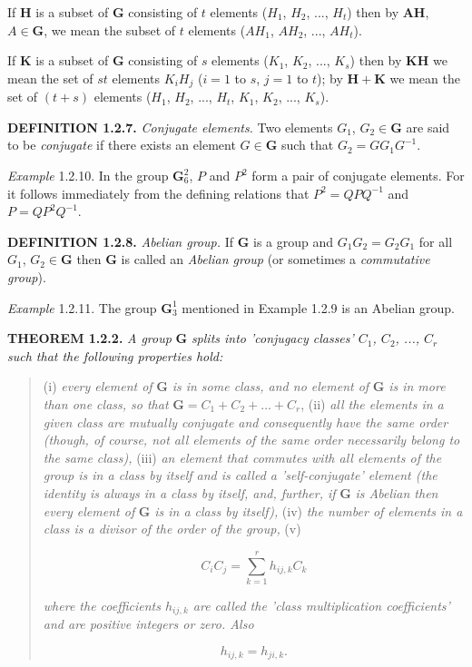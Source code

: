 \documentclass[11pt,a4paper,twoside,openright]{book}
\begin{document}
If $\mathbf{H}$ is a subset of $\mathbf{G}$ consisting of $t$ elements ($H_{1}$, $H_{2}$, ..., $H_{t}$) then by $\mathbf{AH}$, $A \in \mathbf{G}$, we mean the subset of $t$ elements ($AH_{1}$, $AH_{2}$, ..., $AH_{t}$).

If $\mathbf{K}$ is a subset of $\mathbf{G}$ consisting of $s$ elements ($K_{1}$, $K_{2}$, ..., $K_{s}$) then by $\mathbf{KH}$ we mean the set of $st$ elements $K_{i}H_{j}$ ($i = 1$ to $s$, $j = 1$ to $t$); by $\mathbf{H} + \mathbf{K}$ we mean the set of $(t+s)$ elements ($H_{1}$, $H_{2}$, ..., $H_{t}$, $K_{1}$, $K_{2}$, ..., $K_{s}$).

\textbf{DEFINITION 1.2.7.} \textit{Conjugate elements.} Two elements $G_{1}$, $G_{2} \in \mathbf{G}$ are said to be \textit{conjugate} if there exists an element $G \in \mathbf{G}$ such that $G_{2} = GG_{1}G^{-1}$.

\textit{Example} 1.2.10. In the group $\mathbf{G}_6^2$, $P$ and $P^{2}$ form a pair of conjugate elements. For it follows immediately from the defining relations that $P^{2} = QPQ^{-1}$ and $P = QP^{2}Q^{-1}$.

\textbf{DEFINITION 1.2.8.} \textit{Abelian group.} If $\mathbf{G}$ is a group and $G_{1}G_{2} = G_{2}G_{1}$ for all $G_{1}$, $G_{2} \in \mathbf{G}$ then $\mathbf{G}$ is called an \textit{Abelian group} (or sometimes a \textit{commutative group}).

\textit{Example} 1.2.11. The group $\mathbf{G}_3^1$ mentioned in Example 1.2.9 is an Abelian group.

\textbf{THEOREM 1.2.2.} \textit{A group} $\mathbf{G}$ \textit{splits into 'conjugacy classes' $C_{1}$, $C_{2}$, ..., $C_{r}$ such that the following properties hold:}

\begin{quote}(i) \textit{every element of} $\mathbf{G}$ \textit{is in some class, and no element of} $\mathbf{G}$ \textit{is in more than one class, so that} $\mathbf{G} = C_{1} + C_{2} + \ldots + C_{r}$, (ii) \textit{all the elements in a given class are mutually conjugate and consequently have the same order (though, of course, not all elements of the same order necessarily belong to the same class),} (iii) \textit{an element that commutes with all elements of the group is in a class by itself and is called a 'self-conjugate' element (the identity is always in a class by itself, and, further, if} $\mathbf{G}$ \textit{is Abelian then every element of} $\mathbf{G}$ \textit{is in a class by itself),} (iv) \textit{the number of elements in a class is a divisor of the order of the group,} (v)

\begin{equation*}
C_{i}C_{j} = \sum_{k=1}^{r} h_{ij,k}C_{k} \tag{1.2.2}
\end{equation*}

\textit{where the coefficients $h_{ij,k}$ are called the 'class multiplication coefficients' and are positive integers or zero. Also}

\begin{equation*}
h_{ij,k} = h_{ji,k}. \tag{1.2.3}
\end{equation*}
\end{quote}
\end{document}
